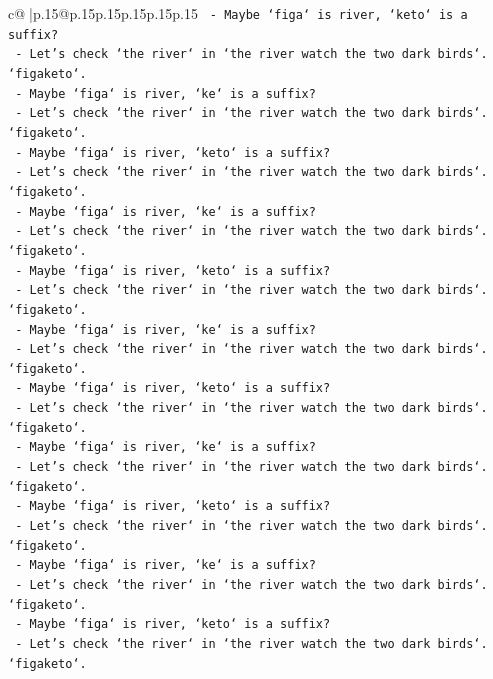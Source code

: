 \documentclass{article}
\begin{document}
{\begin{supertabular}{c@{$\;$}|p{.15\linewidth}@{}p{.15\linewidth}p{.15\linewidth}p{.15\linewidth}p{.15\linewidth}p{.15\linewidth}}
{{{\texttt{     {-} Maybe `figa` is river, `keto` is a suffix?} \\
\texttt{     {-} Let's check `the river` in `the river watch the two dark birds`. `figaketo`.} \\
\texttt{     {-} Maybe `figa` is river, `ke` is a suffix?} \\
\texttt{     {-} Let's check `the river` in `the river watch the two dark birds`. `figaketo`.} \\
\texttt{     {-} Maybe `figa` is river, `keto` is a suffix?} \\
\texttt{     {-} Let's check `the river` in `the river watch the two dark birds`. `figaketo`.} \\
\texttt{     {-} Maybe `figa` is river, `ke` is a suffix?} \\
\texttt{     {-} Let's check `the river` in `the river watch the two dark birds`. `figaketo`.} \\
\texttt{     {-} Maybe `figa` is river, `keto` is a suffix?} \\
\texttt{     {-} Let's check `the river` in `the river watch the two dark birds`. `figaketo`.} \\
\texttt{     {-} Maybe `figa` is river, `ke` is a suffix?} \\
\texttt{     {-} Let's check `the river` in `the river watch the two dark birds`. `figaketo`.} \\
\texttt{     {-} Maybe `figa` is river, `keto` is a suffix?} \\
\texttt{     {-} Let's check `the river` in `the river watch the two dark birds`. `figaketo`.} \\
\texttt{     {-} Maybe `figa` is river, `ke` is a suffix?} \\
\texttt{     {-} Let's check `the river` in `the river watch the two dark birds`. `figaketo`.} \\
\texttt{     {-} Maybe `figa` is river, `keto` is a suffix?} \\
\texttt{     {-} Let's check `the river` in `the river watch the two dark birds`. `figaketo`.} \\
\texttt{     {-} Maybe `figa` is river, `ke` is a suffix?} \\
\texttt{     {-} Let's check `the river` in `the river watch the two dark birds`. `figaketo`.} \\
\texttt{     {-} Maybe `figa` is river, `keto` is a suffix?} \\
\texttt{     {-} Let's check `the river` in `the river watch the two dark birds`. `figaketo`.} \\
}}}
\end{supertabular}}
\end{document}

